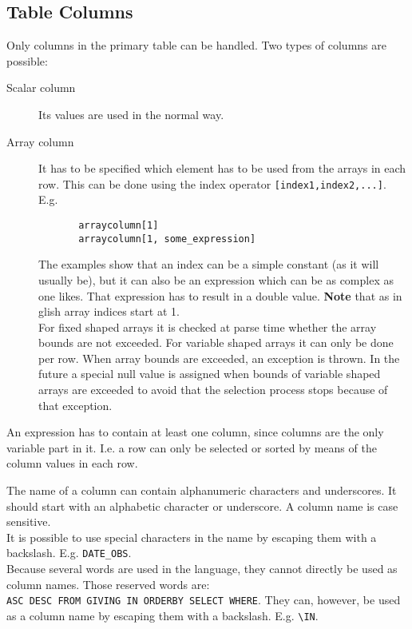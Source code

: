 \subsection{Table Columns}
Only columns in the primary table can be handled.
Two types of columns are possible:
\begin{description}
  \item[ Scalar column] Its values are used in the normal way.
  \item[ Array column]
       It has to be specified which element has to be used from
       the arrays in each row. This can be done using the index operator
       \texttt{[index1,index2,...]}. E.g.
       \begin{verbatim}
       arraycolumn[1]
       arraycolumn[1, some_expression]
       \end{verbatim}
       The examples show that an index can be a simple constant (as it will
       usually be), but it can also be an expression which can be as complex
       as one likes. That expression has to result in a double value.
       \textbf{Note} that as in glish array indices start at 1.
       \\For fixed shaped arrays it is checked at parse time whether
       the array bounds are not exceeded. For variable shaped arrays
       it can only be done per row. When array bounds are exceeded,
       an exception is thrown. In the future a special null value
       is assigned when bounds of variable shaped arrays are exceeded
       to avoid that the selection process stops because of that exception.
\end{description}
An expression has to contain at least one column, since columns
are the only variable part in it. I.e. a row can only be selected
or sorted by means of the column values in each row.

The name of a column can contain alphanumeric characters and underscores.
It should start with an alphabetic character or underscore.
A column name is case sensitive.
\\It is possible to use special characters in the name by
escaping them with a backslash. E.g. \texttt{DATE\_OBS}.
\\
Because several words are used in the language, they cannot directly
be used as column names. Those reserved words are:
\\\texttt{ASC DESC FROM GIVING IN ORDERBY SELECT WHERE}.
They can, however, be used as a column name by escaping
them with a backslash. E.g. \verb+\+\texttt{IN}.


